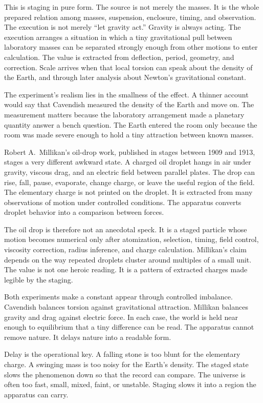 This is staging in pure form. The source is not merely the masses. It is the
whole prepared relation among masses, suspension, enclosure, timing, and
observation. The execution is not merely ``let gravity act.'' Gravity is
always acting. The execution arranges a situation in which a tiny
gravitational pull between laboratory masses can be separated strongly
enough from other motions to enter calculation. The value is extracted from
deflection, period, geometry, and correction. Scale arrives when that local
torsion can speak about the density of the Earth, and through later analysis
about Newton's gravitational constant.

The experiment's realism lies in the smallness of the effect. A thinner
account would say that Cavendish measured the density of the Earth and move
on. The measurement matters because the laboratory arrangement made a
planetary quantity answer a bench question. The Earth entered the room only
because the room was made severe enough to hold a tiny attraction between
known masses.

Robert A.~Millikan's oil-drop work, published in stages between 1909 and
1913, stages a very different awkward state. A charged oil droplet hangs in
air under gravity, viscous drag, and an electric field between parallel
plates. The drop can rise, fall, pause, evaporate, change charge, or leave
the useful region of the field. The elementary charge is not printed on the
droplet. It is extracted from many observations of motion under controlled
conditions. The apparatus converts droplet behavior into a comparison
between forces.

The oil drop is therefore not an anecdotal speck. It is a staged particle
whose motion becomes numerical only after atomization, selection, timing,
field control, viscosity correction, radius inference, and charge
calculation. Millikan's claim depends on the way repeated droplets cluster
around multiples of a small unit. The value is not one heroic reading. It is
a pattern of extracted charges made legible by the staging.

Both experiments make a constant appear through controlled imbalance.
Cavendish balances torsion against gravitational attraction. Millikan
balances gravity and drag against electric force. In each case, the world is
held near enough to equilibrium that a tiny difference can be read. The
apparatus cannot remove nature. It delays nature into a readable form.

Delay is the operational key. A falling stone is too blunt for the
elementary charge. A swinging mass is too noisy for the Earth's density. The
staged state slows the phenomenon down so that the record can compare. The
universe is often too fast, small, mixed, faint, or unstable. Staging slows
it into a region the apparatus can carry.

